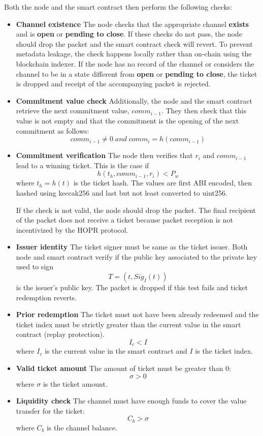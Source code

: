 Both the node and the smart contract then perform the following checks:

\begin{itemize}
      \item
            \textbf{Channel existence} The node checks that the appropriate channel \textbf{exists} and is \textbf{open} or \textbf{pending to close}. If these checks do not pass, the node should drop the packet and the smart contract check will revert. To prevent metadata leakage, the check happens locally rather than on-chain using the blockchain indexer. If the node has no record of the channel or considers the channel to be in a state different from \textbf{open} or \textbf{pending to close}, the ticket is dropped and receipt of the accompanying packet is rejected.
      \item
            \textbf{Commitment value check} Additionally, the node and the smart contract retrieve the next commitment value, $comm_{i-1}$. They then check that this value is not empty and that the commitment is the opening of the next commitment as follows: $$ comm_{i-1} \neq 0 \; and \; comm_{i}=h(comm_{i-1})$$
      \item
            \textbf{Commitment verification} The node then verifies that $r_i$ and $comm_{i-1}$ lead to a winning ticket. This is the case if $$h(t_h, comm_{i-1}, r_i) <P_w$$ where $t_h=h(t)$ is the ticket hash. The values are first ABI encoded, then hashed using keccak256 and last but not least converted to uint256.

            If the check is not valid, the node should drop the packet.
            The final recipient of the packet does not receive a ticket because packet reception is not incentivized by the HOPR protocol.
      \item
            \textbf{Issuer identity} The ticket signer must be same as the ticket issuer. Both node and smart contract verify if the public key associated to the private key used to sign $$T= (t, Sig_I(t))$$ is the issuer's public key. The packet is dropped if this test fails and ticket redemption reverts.
      \item
            \textbf{Prior redemption} The ticket must not have been already redeemed and the ticket index must be strictly greater than the current value in the smart contract (replay protection).
            $$I_c <I$$ where $I_c$ is the current value in the smart contract and $I$ is the ticket index.
      \item
            \textbf{Valid ticket amount} The amount of ticket must be greater than 0: $$\sigma>0$$ where $\sigma$ is the ticket amount.
      \item
            \textbf{Liquidity check} The channel must have enough funds to cover the value transfer for the ticket: $$ C_b>\sigma$$ where $C_b$ is the channel balance.
\end{itemize}

